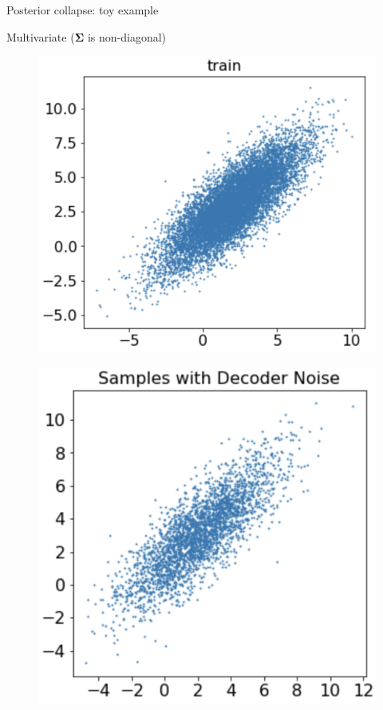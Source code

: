 \documentclass{beamer}
\newcommand{\bSigma}{\boldsymbol{\Sigma}}
\begin{document}
\begin{frame}{Posterior collapse: toy example}
	\begin{block}{Multivariate ($\bSigma$ is non-diagonal)}
		\vspace{-0.5cm}
		\begin{minipage}[t]{0.33\columnwidth}
			\begin{figure}[h]
				\centering
				\includegraphics[width=.8\linewidth]{figs/posterior_collapse_toy_1.png}
			\end{figure}
		\end{minipage}%
		\begin{minipage}[t]{0.33\columnwidth}
			\begin{figure}[h]
				\centering
				\includegraphics[width=0.75\linewidth]{figs/posterior_collapse_toy_3.png}

\end{figure}
\end{minipage}
\end{block}
\end{frame}
\end{document}
